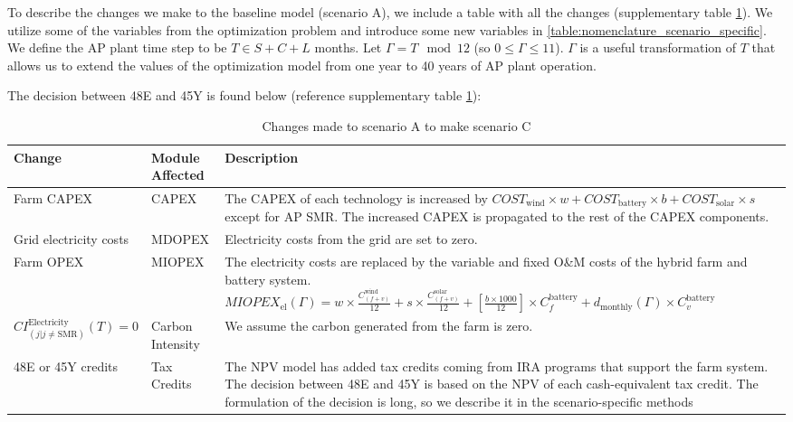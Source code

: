 \documentclass{article}
\begin{document}
To describe the changes we make to the baseline model (scenario A), we include a table with all the changes (supplementary table \ref{table:changes_module_descriptions}). We utilize some of the variables from the optimization problem and introduce some new variables in \ref{table:nomenclature_scenario_specific}. We define the AP plant time step to be \( T \in S+C+L \) months. Let \( \Gamma = T \mod 12 \) (so \( 0 \leq \Gamma \leq 11 \)). \( \Gamma \) is a useful transformation of \( T \) that allows us to extend the values of the optimization model from one year to 40 years of AP plant operation.

The decision between 48E and 45Y is found below (reference supplementary table \ref{table:changes_module_descriptions}):

\begin{table}[H]
  \centering
  \caption{Changes made to scenario A to make scenario C}
  \label{table:changes_module_descriptions}
  \begin{tabular}{@{}lp{2cm}p{10cm}@{}}
    \toprule
    \textbf{Change} & \textbf{Module Affected} & \textbf{Description} \\ \midrule
    Farm CAPEX & CAPEX & The CAPEX of each technology is increased by $COST_{\text{wind}} \times w + COST_{\text{battery}} \times b + COST_{\text{solar}} \times s$ except for AP SMR. The increased CAPEX is propagated to the rest of the CAPEX components. \\
    Grid electricity costs & MDOPEX & Electricity costs from the grid are set to zero. \\
    Farm OPEX & MIOPEX & The electricity costs are replaced by the variable and fixed O\&M costs of the hybrid farm and battery system.
    \newline $MIOPEX_{\text{el}}(\Gamma) = w \times \frac{C_{(f+v)}^{\text{wind}}}{12} + s \times \frac{C_{(f+v)}^{\text{solar}}}{12} + \left[\frac{b \times 1000}{12}\right] \times C_f^{\text{battery}} + d_{\text{monthly}}(\Gamma) \times C_v^{\text{battery}}$ \\
    $CI_{(j | j \neq \text{SMR})}^{\text{Electricity}}(T) = 0$ & Carbon Intensity & We assume the carbon generated from the farm is zero. \\
    48E or 45Y credits & Tax Credits & The NPV model has added tax credits coming from IRA programs that support the farm system. The decision between 48E and 45Y is based on the NPV of each cash-equivalent tax credit. The formulation of the decision is long, so we describe it in the scenario-specific methods \\

\end{tabular}
\end{table}
\end{document}
